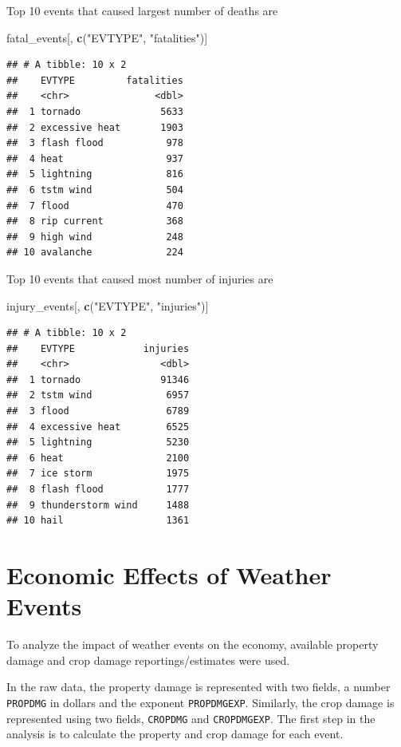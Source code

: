 \documentclass[]{article}
\newenvironment{Shaded}{\begin{snugshade}}{\end{snugshade}}
\newcommand{\KeywordTok}[1]{\textcolor[rgb]{0.13,0.29,0.53}{\textbf{#1}}}
\newcommand{\StringTok}[1]{\textcolor[rgb]{0.31,0.60,0.02}{#1}}
\newcommand{\NormalTok}[1]{#1}
\begin{document}
Top 10 events that caused largest number of deaths are

\begin{Shaded}
\begin{Highlighting}[]
\NormalTok{fatal_events[, }\KeywordTok{c}\NormalTok{(}\StringTok{"EVTYPE"}\NormalTok{, }\StringTok{"fatalities"}\NormalTok{)]}
\end{Highlighting}
\end{Shaded}

\begin{verbatim}
## # A tibble: 10 x 2
##    EVTYPE         fatalities
##    <chr>               <dbl>
##  1 tornado              5633
##  2 excessive heat       1903
##  3 flash flood           978
##  4 heat                  937
##  5 lightning             816
##  6 tstm wind             504
##  7 flood                 470
##  8 rip current           368
##  9 high wind             248
## 10 avalanche             224
\end{verbatim}

Top 10 events that caused most number of injuries are

\begin{Shaded}
\begin{Highlighting}[]
\NormalTok{injury_events[, }\KeywordTok{c}\NormalTok{(}\StringTok{"EVTYPE"}\NormalTok{, }\StringTok{"injuries"}\NormalTok{)]}
\end{Highlighting}
\end{Shaded}

\begin{verbatim}
## # A tibble: 10 x 2
##    EVTYPE            injuries
##    <chr>                <dbl>
##  1 tornado              91346
##  2 tstm wind             6957
##  3 flood                 6789
##  4 excessive heat        6525
##  5 lightning             5230
##  6 heat                  2100
##  7 ice storm             1975
##  8 flash flood           1777
##  9 thunderstorm wind     1488
## 10 hail                  1361
\end{verbatim}

\section{Economic Effects of Weather
Events}\label{economic-effects-of-weather-events}

To analyze the impact of weather events on the economy, available
property damage and crop damage reportings/estimates were used.

In the raw data, the property damage is represented with two fields, a
number \texttt{PROPDMG} in dollars and the exponent \texttt{PROPDMGEXP}.
Similarly, the crop damage is represented using two fields,
\texttt{CROPDMG} and \texttt{CROPDMGEXP}. The first step in the analysis
is to calculate the property and crop damage for each event.
\end{document}
